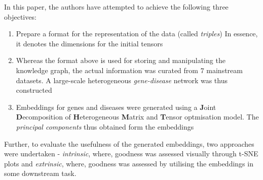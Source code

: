 \begin{sloppypar*}
    In this paper, the authors have attempted to achieve the following three
    objectives:
    \begin{enumerate}
        \item Prepare a format for the representation of the data (called \textit{triples})
            In essence, it denotes the dimensions for the initial tensors
        \item Whereas the format above is used for storing and manipulating the
            knowledge graph, the actual information was curated from $7$ mainstream
            datasets. A large-scale heterogeneous \textit{gene-disease} network
            was thus constructed \cite{heteroData}
        \item Embeddings for genes and diseases were generated using a \textbf{J}oint
            \textbf{D}ecomposition of \textbf{H}eterogeneous \textbf{M}atrix
            and \textbf{T}ensor optmisation model. The \textit{principal components} 
            thus obtained form the embeddings
    \end{enumerate}
    
    \noindent Further, to evaluate the usefulness of the generated embeddings, two
    approaches were undertaken - \textit{intrinsic}, where, goodness was assessed
    visually through t-SNE plots and \textit{extrinsic}, where, goodness was assessed
    by utilising the embeddings in some downstream task.
\end{sloppypar*}
